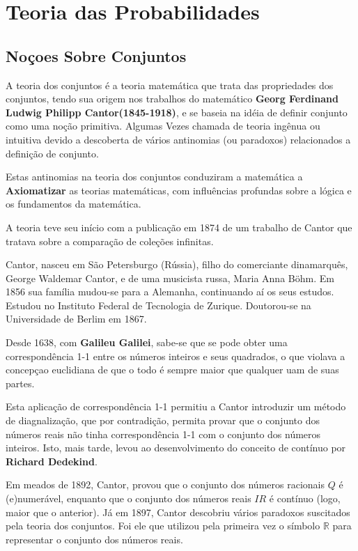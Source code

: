 \chapter{Teoria das Probabilidades}
\section{Noçoes Sobre Conjuntos}

\inic A teoria dos conjuntos é a teoria matemática que trata das propriedades dos conjuntos, tendo sua origem nos trabalhos do matemático \textbf{Georg Ferdinand Ludwig Philipp Cantor(1845-1918)}, e se baseia na idéia de definir conjunto como uma noção primitiva. Algumas Vezes chamada de teoria ingênua ou intuitiva devido a descoberta de vários antinomias (ou paradoxos) relacionados a definição de conjunto.\vskip0.3cm

\inic Estas antinomias na teoria dos conjuntos conduziram a matemática a \textbf{Axiomatizar} as teorias  matemáticas, com influências profundas sobre a lógica e os fundamentos da matemática.\vskip0.3cm

\inic A teoria teve seu início com a publicação em 1874 de um trabalho de Cantor que tratava sobre a comparação de coleções infinitas.\vskip0.3cm

\inic Cantor, nasceu em São Petersburgo (Rússia), filho do comerciante dinamarquês, George Waldemar Cantor, e de uma musicista russa, Maria Anna Böhm. Em 1856 sua família mudou-se para a Alemanha, continuando aí os seus estudos. Estudou no Instituto Federal de Tecnologia de Zurique. Doutorou-se na Universidade de Berlim em 1867.\vskip0.3cm

\inic Desde 1638, com \textbf{Galileu Galilei}, sabe-se que se pode obter uma correspondência 1-1 entre os números inteiros e seus quadrados, o que violava a concepçao euclidiana de que o todo é sempre maior que qualquer uam de suas partes.\vskip0.3cm

\inic Esta aplicação de correspondência 1-1 permitiu a Cantor introduzir um método de diagnalização, que por contradição, permita provar que o conjunto dos números reais não tinha correspondência 1-1 com o conjunto dos números inteiros. Isto, mais tarde, levou ao desenvolvimento do conceito de contínuo por \textbf{Richard Dedekind}. \vskip0.3cm

\inic Em meados de 1892, Cantor, provou que o conjunto dos números racionais $Q$ é (e)numerável, enquanto que o conjunto dos números reais $IR$ é contínuo (logo, maior que o anterior). Já em 1897, Cantor descobriu vários paradoxos suscitados pela teoria dos conjuntos. Foi ele que utilizou pela primeira vez o símbolo ${\displaystyle \mathbb {R}}$ para representar o conjunto dos números reais.\vskip0.3cm


